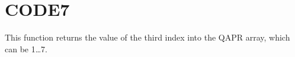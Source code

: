 \section{CODE7}
\label{sect:code7}

\noindent This function returns the value of the third index into the QAPR
array, which can be 1{\ldots}7.\\
